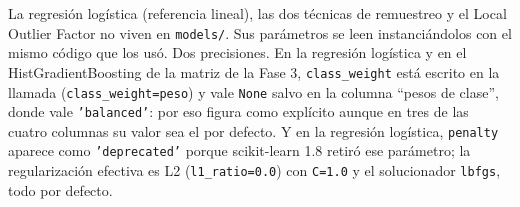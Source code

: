 \documentclass[11pt,a4paper]{article}
\begin{document}
La regresión logística (referencia lineal), las dos técnicas de remuestreo y
el Local Outlier Factor no viven en \texttt{models/}. Sus parámetros se leen
instanciándolos con el mismo código que los usó. Dos precisiones. En la
regresión logística y en el HistGradientBoosting de la matriz de la Fase 3,
\texttt{class\_weight} está escrito en la llamada (\texttt{class\_weight=peso})
y vale \texttt{None} salvo en la columna ``pesos de clase'', donde vale
\texttt{'balanced'}: por eso figura como explícito aunque en tres de las cuatro
columnas su valor sea el por defecto. Y en la regresión logística,
\texttt{penalty} aparece como \texttt{'deprecated'} porque scikit-learn 1.8
retiró ese parámetro; la regularización efectiva es L2
(\texttt{l1\_ratio=0.0}) con \texttt{C=1.0} y el solucionador \texttt{lbfgs},
todo por defecto.
\end{document}
